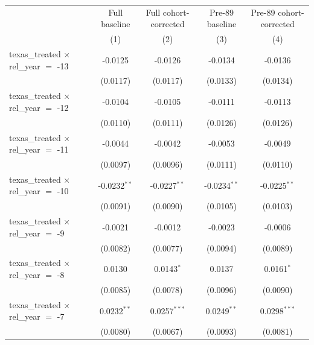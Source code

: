 
\begingroup
\centering
\begin{tabular}{lcccc}
   \toprule
                                                & Full baseline  & Full cohort-corrected & Pre-89 baseline & Pre-89 cohort-corrected \\   
                                                & (1)            & (2)                   & (3)             & (4)\\  
   \midrule 
   texas\_treated $\times$ rel\_year $=$ -13    & -0.0125        & -0.0126               & -0.0134         & -0.0136\\   
                                                & (0.0117)       & (0.0117)              & (0.0133)        & (0.0134)\\   
   texas\_treated $\times$ rel\_year $=$ -12    & -0.0104        & -0.0105               & -0.0111         & -0.0113\\   
                                                & (0.0110)       & (0.0111)              & (0.0126)        & (0.0126)\\   
   texas\_treated $\times$ rel\_year $=$ -11    & -0.0044        & -0.0042               & -0.0053         & -0.0049\\   
                                                & (0.0097)       & (0.0096)              & (0.0111)        & (0.0110)\\   
   texas\_treated $\times$ rel\_year $=$ -10    & -0.0232$^{**}$ & -0.0227$^{**}$        & -0.0234$^{**}$  & -0.0225$^{**}$\\   
                                                & (0.0091)       & (0.0090)              & (0.0105)        & (0.0103)\\   
   texas\_treated $\times$ rel\_year $=$ -9     & -0.0021        & -0.0012               & -0.0023         & -0.0006\\   
                                                & (0.0082)       & (0.0077)              & (0.0094)        & (0.0089)\\   
   texas\_treated $\times$ rel\_year $=$ -8     & 0.0130         & 0.0143$^{*}$          & 0.0137          & 0.0161$^{*}$\\   
                                                & (0.0085)       & (0.0078)              & (0.0096)        & (0.0090)\\   
   texas\_treated $\times$ rel\_year $=$ -7     & 0.0232$^{**}$  & 0.0257$^{***}$        & 0.0249$^{**}$   & 0.0298$^{***}$\\   
                                                & (0.0080)       & (0.0067)              & (0.0093)        & (0.0081)\\   

\end{tabular}
